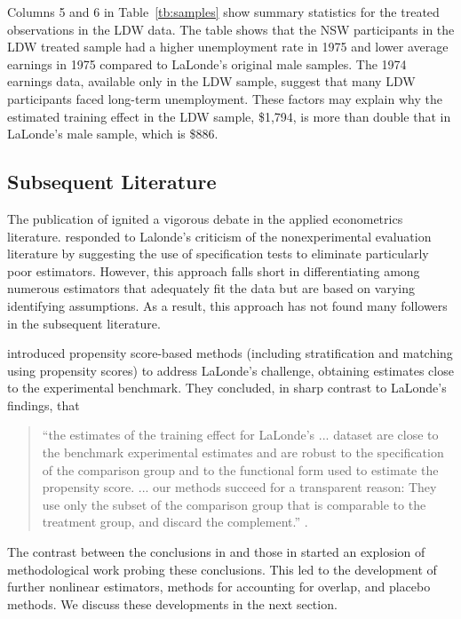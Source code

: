 \documentclass[letterpaper,12pt,leqno]{article}
\begin{document}
Columns 5 and 6 in Table~\ref{tb:samples} show summary statistics for the treated observations in the LDW data. The table shows that the NSW participants in the LDW treated sample had a higher unemployment rate in 1975 and lower average earnings in 1975 compared to LaLonde's original male samples. The 1974 earnings data, available only in the LDW sample, suggest that many LDW participants faced long-term unemployment. These factors may explain why the estimated training effect in the LDW sample, \$1,794, is more than double that in LaLonde's male sample, which is \$886. 

\subsection{Subsequent Literature}

The publication of \citet{LaLonde} ignited a vigorous debate in the applied econometrics literature. \citet{heckman1989choosing} responded to Lalonde's criticism of the nonexperimental evaluation literature by suggesting the use of specification tests to eliminate particularly poor estimators. However, this approach falls short in differentiating among numerous estimators that adequately fit the data but are based on varying identifying assumptions. As a result, this approach has not found many followers in the subsequent literature.

\citet{dehejiawahba} introduced propensity score-based methods (including stratification and matching using propensity scores) to address LaLonde's challenge, obtaining estimates close to the experimental benchmark. They concluded, in sharp contrast to LaLonde's findings, that
\begin{quote}
``the estimates of the training effect for LaLonde's ... dataset are close to the benchmark experimental estimates and are robust to the specification of the comparison group and to the functional form used to estimate the propensity score. ... our methods succeed for a transparent reason: They use only the subset of the comparison group that is comparable to the treatment group, and discard the complement.'' \cite[p. 1062]{dehejiawahba}.
\end{quote}
The contrast between the conclusions in \citet{dehejiawahba} and those in \citet{LaLonde} started an explosion of methodological work probing these conclusions. This led to the development of further nonlinear estimators, methods for accounting for overlap, and placebo methods. We discuss these developments in the next section.
\end{document}
